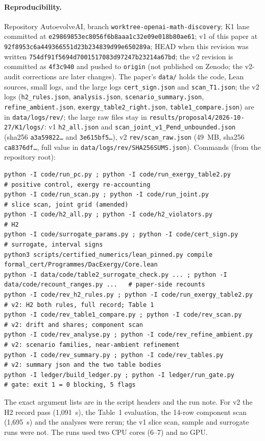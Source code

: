 \documentclass[10pt]{article}
\begin{document}
\paragraph{Reproducibility.} Repository AutoevolveAI, branch \texttt{worktree-openai-math-discovery}; K1 lane committed at \texttt{e29869853ec8056f6b8aaa1c32e09e018b80ae61}; v1 of this paper at \texttt{92f8953c6a449366551d23b234839d99e650289a}; HEAD when this revision was written \texttt{754df91f5694d7001517083d97247b23214a67bd}; the v2 revision is committed as \texttt{4f3c940} and pushed to \texttt{origin} (not published on Zenodo; the v2-audit corrections are later changes). The paper's \texttt{data/} holds the code, Lean sources, small logs, and the large logs \texttt{cert\_sign.json} and
\texttt{scan\_T1.json}; the v2 logs (\texttt{h2\_rules.json}, \texttt{analysis.json}, \texttt{scenario\_summary.json}, \texttt{refine\_ambient.json}, \texttt{exergy\_table2\_right.json}, \texttt{table1\_compare.json}) are in \texttt{data/logs/rev/}; the large raw files stay in \texttt{results/proposal4/2026-10-27/K1/logs/}: v1 \texttt{h2\_all.json} and \texttt{scan\_joint\_v1\_Pend\_unbounded.json} (sha256 \texttt{a3a59822\ldots} and \texttt{3e615bf5\ldots}), v2 \texttt{rev/scan\_raw.json} (49~MB, sha256 \texttt{ca8376df\ldots}, full value in \texttt{data/logs/rev/SHA256SUMS.json}). Commands (from the repository root):
\begin{lstlisting}[basicstyle=\ttfamily\scriptsize]
python -I code/run_pc.py ; python -I code/run_exergy_table2.py          # positive control, exergy re-accounting
python -I code/run_scan.py ; python -I code/run_joint.py                # slice scan, joint grid (amended)
python -I code/h2_all.py ; python -I code/h2_violators.py               # H2
python -I code/surrogate_params.py ; python -I code/cert_sign.py        # surrogate, interval signs
python3 scripts/certified_numerics/lean_pinned.py compile formal_cert/Programmes/DacExergy/Core.lean
python -I data/code/table2_surrogate_check.py ... ; python -I data/code/recount_ranges.py ...   # paper-side recounts
python -I code/rev_h2_rules.py ; python -I code/run_exergy_table2.py     # v2: H2 both rules, full record; Table 1
python -I code/rev_table1_compare.py ; python -I code/rev_scan.py       # v2: drift and shares; component scan
python -I code/rev_analyse.py ; python -I code/rev_refine_ambient.py    # v2: scenario families, near-ambient refinement
python -I code/rev_summary.py ; python -I code/rev_tables.py            # v2: summary json and the two table bodies
python -I ledger/build_ledger.py ; python -I ledger/run_gate.py         # gate: exit 1 = 0 blocking, 5 flags
\end{lstlisting}
The exact argument lists are in the script headers and the run note. For v2 the H2 record pass (1,091~s), the Table~1 evaluation, the 14-row component scan (1,695~s) and the analyses were rerun; the v1 slice scan, sample and surrogate runs were not. The runs used two CPU cores (6--7) and no GPU.
\end{document}
